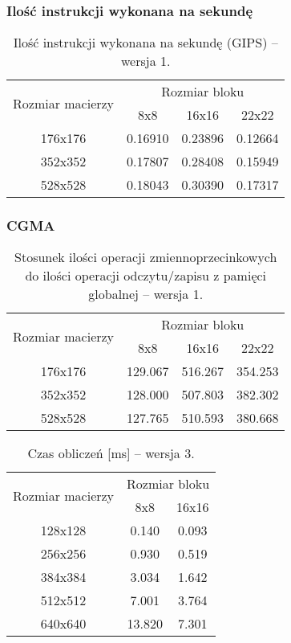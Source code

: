 \subsubsection{Ilość instrukcji wykonana na sekundę}

\begin{table}[H]
\centering
\begin{tabular}{|c|c|c|c|}
\hline
\multirow{2}{*}{Rozmiar macierzy} & \multicolumn{3}{c|}{Rozmiar bloku} \\ \cline{2-4}
& 8x8 & 16x16 & 22x22 \\ \hline
176x176 & 0.16910 & 0.23896 & 0.12664 \\ \hline
352x352 & 0.17807 & 0.28408 & 0.15949 \\ \hline
528x528 & 0.18043 & 0.30390 & 0.17317 \\ \hline
\end{tabular}
\caption{Ilość instrukcji wykonana na sekundę (GIPS) -- wersja 1.}
\end{table}

\subsubsection{CGMA}

\begin{table}[H]
\centering
\begin{tabular}{|c|c|c|c|}
\hline
\multirow{2}{*}{Rozmiar macierzy} & \multicolumn{3}{c|}{Rozmiar bloku} \\ \cline{2-4}
& 8x8 & 16x16 & 22x22 \\ \hline
176x176 & 129.067 & 516.267 & 354.253 \\ \hline
352x352 & 128.000 & 507.803 & 382.302 \\ \hline
528x528 & 127.765 & 510.593 & 380.668 \\ \hline
\end{tabular}
\caption{Stosunek ilości operacji zmiennoprzecinkowych do ilości operacji odczytu/zapisu z pamięci globalnej -- wersja 1.}
\end{table}


\begin{table}[H]
\centering
\begin{tabular}{|c|c|c|}
\hline
\multirow{2}{*}{Rozmiar macierzy} & \multicolumn{2}{c|}{Rozmiar bloku} \\ \cline{2-3}
& 8x8 & 16x16 \\ \hline
128x128 & 0.140 & 0.093 \\ \hline
256x256 & 0.930 & 0.519 \\ \hline
384x384 & 3.034 & 1.642 \\ \hline
512x512 & 7.001 & 3.764 \\ \hline
640x640 & 13.820 & 7.301 \\ \hline
\end{tabular}
\caption{Czas obliczeń [ms] -- wersja 3.}
\end{table}

